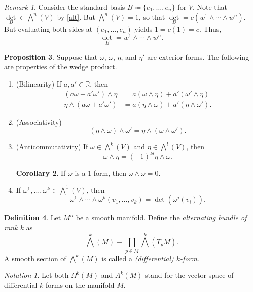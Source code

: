 \documentclass[10pt,letterpaper,cm]{nupset}
\theoremstyle{definition}
\newtheorem{definition}{Definition}[subsection]
\theoremstyle{theorem}
\newtheorem{prop}[definition]{Proposition}
\newtheorem{corollary}[definition]{Corollary}
\theoremstyle{remark}
\newtheorem{remark}[definition]{Remark}
\newtheorem*{notation}{Notation}
\newcommand{\R}{\mathbb R}
\newcommand{\1}{\mathbf{1}}
\newcommand{\0}{\vec 0}
\begin{document}
\begin{remark}
Consider the standard basis $B \coloneqq   \{e_1, \ldots, e_n\}$ for $V$. Note that $\underset{B}{\det} \in \bigwedge^n(V)$ by \cref{alt}.
But $\bigwedge^n(V) = 1$, so that $\underset{B}{\det} = c(w^1 \wedge \cdots \wedge w^n)$. But evaluating both sides at $(e_1, \ldots, e_n)$ yields $1 = c(1) = c$. Thus, $$\underset{B}{\det} = w^1 \wedge \cdots \wedge w^n.$$
\end{remark}

\begin{prop} Suppose that $\omega$, $\omega$, $\eta$, and $\eta'$ are exterior forms. The following are properties of the wedge product.
\begin{enumerate}
\item{(Bilinearity)} If $a, a' \in \R$, then 
\begin{align*}
(a\omega + a'\omega ')\wedge \eta &= a(\omega \wedge \eta) + a'(\omega' \wedge \eta)   \\   \eta \wedge (a\omega + a'\omega ') &= a(\eta \wedge \omega) + a'(\eta \wedge \omega' ). 
\end{align*}
\item{(Associativity)} $$(\eta \wedge \omega) \wedge \omega' =    \eta \wedge (\omega \wedge \omega') .$$
\item{(Anticommutativity)} If $\omega \in \bigwedge^k(V)$ and $\eta \in \bigwedge^l(V)$, then $$\omega \wedge \eta = ({-}1)^{kl}\eta \wedge \omega.   $$
\begin{corollary}
If $\omega$ is a $1$-form, then $\omega \wedge \omega = 0$.
\end{corollary}
\item If $\omega^1, \ldots, \omega^k \in \bigwedge^1(V)$, then $$ \omega^1 \wedge \cdots \wedge \omega^k(v_1, \ldots, v_k) =\det(\omega^j(v_i)). $$
\end{enumerate}
\end{prop}

\begin{definition}
Let $M^n$ be a smooth manifold. Define the \textit{alternating bundle of rank $k$} as $$\bigwedge^k(M) \equiv \coprod_{p\in M} \bigwedge^k(T_pM).  $$ 
A smooth section of $\bigwedge^k(M)$ is called a \textit{(differential) $k$-form}.
\end{definition}


\begin{notation}
Let both $\Omega^k(M)$ and $A^k(M)$ stand for the vector space of differential $k$-forms on the manifold $M$.
\end{notation}
\end{document}
